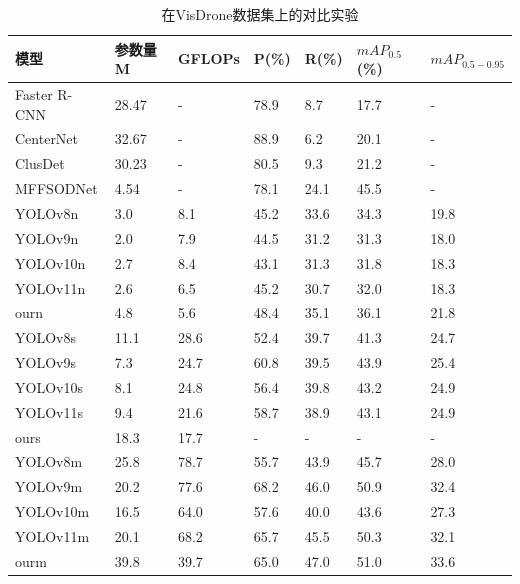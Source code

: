 \documentclass[runningheads]{llncs}
\begin{document}
\begin{table}[H]
    \centering
    \caption{在VisDrone数据集上的对比实验}
    \label{tab:compare_studies_vd}
    \begin{tabular}{p{}p{}p{}p{}p{}p{}p{}}
        \toprule
        模型          & 参数量 M & GFLOPs & P(\%) & R(\%)  & $mAP_{0.5}$(\%) & $mAP_{0.5-0.95}$ \\ 
        \midrule
        Faster R-CNN & 28.47   & -      & 78.9  & 8.7    & 17.7            & -                \\
        CenterNet    & 32.67   & -      & 88.9  & 6.2    & 20.1            & -                \\
        ClusDet      & 30.23   & -      & 80.5  & 9.3    & 21.2            & -                \\
        MFFSODNet    & 4.54    & -      & 78.1  & 24.1   & 45.5            & -                \\
        \midrule
        YOLOv8n      & 3.0     & 8.1    & 45.2  & 33.6   & 34.3            & 19.8             \\
        YOLOv9n      & 2.0     & 7.9    & 44.5  & 31.2   & 31.3            & 18.0             \\
        YOLOv10n     & 2.7     & 8.4    & 43.1  & 31.3   & 31.8            & 18.3             \\
        YOLOv11n     & 2.6     & 6.5    & 45.2  & 30.7   & 32.0            & 18.3             \\
        ourn         & 4.8     & 5.6    & 48.4  & 35.1   & 36.1            & 21.8             \\
        \midrule
        YOLOv8s      & 11.1    & 28.6   & 52.4  & 39.7   & 41.3            & 24.7             \\
        YOLOv9s      & 7.3     & 24.7   & 60.8  & 39.5   & 43.9            & 25.4             \\
        YOLOv10s     & 8.1     & 24.8   & 56.4  & 39.8   & 43.2            & 24.9             \\
        YOLOv11s     & 9.4     & 21.6   & 58.7  & 38.9   & 43.1            & 24.9             \\
        ours         & 18.3    & 17.7   & - & -  & -           & -             \\
        \midrule
        YOLOv8m      & 25.8    & 78.7   & 55.7  & 43.9   & 45.7            & 28.0             \\
        YOLOv9m      & 20.2    & 77.6   & 68.2  & 46.0   & 50.9            & 32.4             \\
        YOLOv10m     & 16.5    & 64.0   & 57.6  & 40.0   & 43.6            & 27.3             \\
        YOLOv11m     & 20.1    & 68.2   & 65.7  & 45.5   & 50.3            & 32.1             \\
        ourm         & 39.8    & 39.7   & 65.0  & 47.0   & 51.0            & 33.6             \\
        \bottomrule
    \end{tabular}
\end{table}
\end{document}
